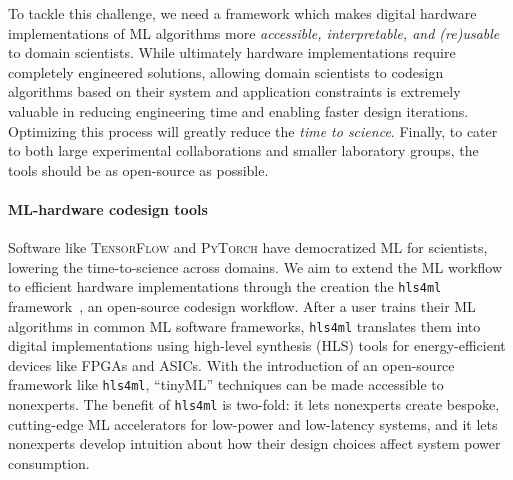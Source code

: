 \documentclass[sigconf]{acmart}
\newcommand{\hlsfml}{\texttt{hls4ml}\xspace}
\begin{document}
To tackle this challenge, we need a framework which makes digital hardware implementations of ML algorithms more \textit{accessible, interpretable, and (re)usable} to domain scientists.  
While ultimately hardware implementations require completely engineered solutions, allowing domain scientists to codesign algorithms based on their system and application constraints is extremely valuable in reducing engineering time and enabling faster design iterations.
Optimizing this process will greatly reduce the \textit{time to science}.  
Finally, to cater to both large experimental collaborations and smaller laboratory groups, the tools should be as open-source as possible.

\paragraph{\textbf{ML-hardware codesign tools}}
Software like \textsc{TensorFlow} and \textsc{PyTorch} have democratized ML for scientists, lowering the time-to-science across domains. 
We aim to extend the ML workflow to efficient hardware implementations through the creation the \hlsfml framework~\cite{Duarte:2018ite,hls4ml}, an open-source codesign workflow. 
After a user trains their ML algorithms in common ML software frameworks, \hlsfml translates them into digital implementations using high-level synthesis (HLS) tools for energy-efficient devices like FPGAs and ASICs.
With the introduction of an open-source framework like \hlsfml, ``tinyML'' techniques can be made accessible to nonexperts. 
The benefit of \hlsfml is two-fold: it lets nonexperts create bespoke, cutting-edge ML accelerators for low-power and low-latency systems, and it lets nonexperts develop intuition about how their design choices affect system power consumption.
\end{document}
